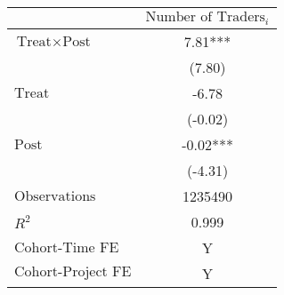 \begin{tabular}{lc}
\toprule
& $\text{Number of Traders}_{i}$ \\
\midrule
$\text{Treat} \times \text{Post}$ & 7.81*** \\
 & (7.80) \\
$\text{Treat}$ & -6.78 \\
 & (-0.02) \\
$\text{Post}$ & -0.02*** \\
 & (-4.31) \\
\midrule
$\text{Observations}$ & 1235490 \\
$R^2$ & 0.999 \\
$\text{Cohort-Time FE}$ & Y \\
$\text{Cohort-Project FE}$ & Y \\
\bottomrule
\end{tabular}
